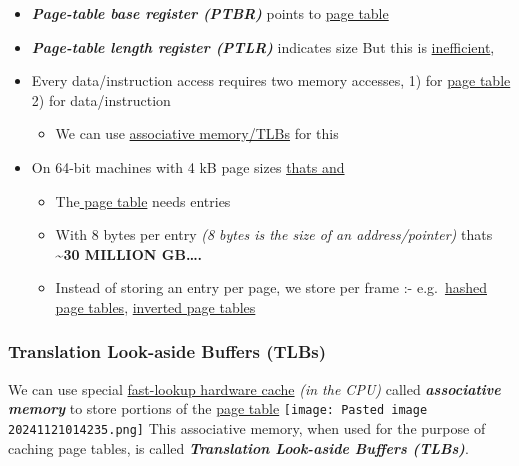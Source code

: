 \begin{itemize}
\tightlist
\item
  \textbf{\textit{Page-table base register (PTBR)}} points to \ul{page
  table}
\item
  \textbf{\textit{Page-table length register (PTLR)}} indicates size But
  this is \ul{inefficient},
\item
  Every data/instruction access requires two memory accesses, 1) for
  \ul{page table} 2) for data/instruction

  \begin{itemize}
  \tightlist
  \item
    We can use \ul{associative memory/TLBs} for this
  \end{itemize}
\item
  On 64-bit machines with 4 kB page sizes \ul{thats
   and }

  \begin{itemize}
  \tightlist
  \item
    The\ul{ page table} needs  entries
  \item
    With 8 bytes per entry \textit{(8 bytes is the size of an
    address/pointer)} thats \textbf{\textasciitilde30 MILLION GB\ldots.}
  \item
    Instead of storing an entry per page, we store per frame :-
    e.g.~\ul{hashed page tables}, \ul{inverted page tables}
  \end{itemize}
\end{itemize}

\subsubsection*{Translation Look-aside Buffers (TLBs)}

We can use special \ul{fast-lookup hardware cache} \textit{(in the CPU)}
called \textbf{\textit{associative memory}} to store portions of the
\ul{page table} \texttt{[image: Pasted image 20241121014235.png]} This
associative memory, when used for the purpose of caching page tables, is
called \textbf{\textit{Translation Look-aside Buffers (TLBs)}}.

